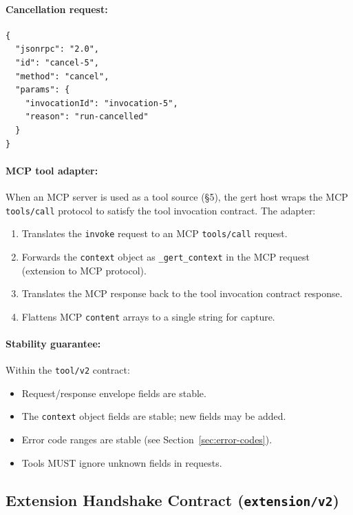 \paragraph{Cancellation request:}

\begin{verbatim}
{
  "jsonrpc": "2.0",
  "id": "cancel-5",
  "method": "cancel",
  "params": {
    "invocationId": "invocation-5",
    "reason": "run-cancelled"
  }
}
\end{verbatim}

\paragraph{MCP tool adapter:}

When an MCP server is used as a tool source (§5), the gert host wraps the MCP
\texttt{tools/call} protocol to satisfy the tool invocation contract.  The
adapter:

\begin{enumerate}
  \item Translates the \texttt{invoke} request to an MCP \texttt{tools/call}
        request.
  \item Forwards the \texttt{context} object as \texttt{\_gert\_context} in the
        MCP request (extension to MCP protocol).
  \item Translates the MCP response back to the tool invocation contract
        response.
  \item Flattens MCP \texttt{content} arrays to a single string for capture.
\end{enumerate}

\paragraph{Stability guarantee:}

Within the \texttt{tool/v2} contract:

\begin{itemize}
  \item Request/response envelope fields are stable.
  \item The \texttt{context} object fields are stable; new fields may be added.
  \item Error code ranges are stable (see Section~\ref{sec:error-codes}).
  \item Tools MUST ignore unknown fields in requests.
\end{itemize}

\subsection{Extension Handshake Contract (\texttt{extension/v2})}
\label{sec:extension-handshake-contract}

